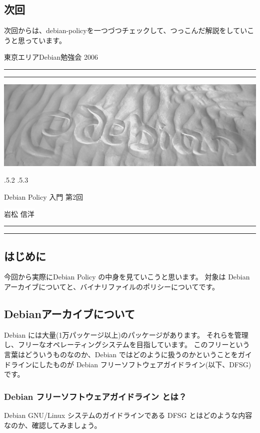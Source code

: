 \documentclass[mingoth,a4paper]{jsarticle}
\makeatletter
\renewcommand{\section}{\@startsection{section}{1}{\z@}%
    {\Cvs \@plus.5\Cdp \@minus.2\Cdp}%
    {.5\Cvs \@plus.3\Cdp}%
    {\normalfont\Huge\headfont\raggedright\centering}} %
\newcommand{\dancersection}[2]{%
\newpage
東京エリアDebian勉強会 2006
\hrule
\vspace{0.5mm}
\hrule
\hfill{}\includegraphics[width=16cm]{image2006-natsu/guruguru-sand-light.png}\\
\vspace{-5cm}
\begin{center}
\section{#1}
\end{center}
\hfill{}\colorbox{white}{#2}\hspace{3cm}\space\\
\vspace{1cm}
\hrule
\vspace{0.5mm}
\hrule
\vspace{1cm}
}
\makeatother
\begin{document}
\subsection{次回}
	次回からは、debian-policyを一つづつチェックして、つっこんだ解説をしていこうと思っています。


\dancersection{Debian Policy 入門 第2回}{岩松 信洋}
\label{sec:uekawa}
\subsection{はじめに}
 今回から実際にDebian Policy の中身を見ていこうと思います。
 対象は Debian アーカイブについてと、バイナリファイルのポリシーについてです。

\subsection{Debianアーカイブについて}

Debian には大量(1万パッケージ以上)のパッケージがあります。
それらを管理し、フリーなオペレーティングシステムを目指しています。
このフリーという言葉はどういうものなのか、Debian ではどのように扱うのかということをガイドラインにしたものが Debian フリーソフトウェアガイドライン(以下、DFSG) です。
 
\subsubsection{Debian フリーソフトウェアガイドライン とは？}

Debian GNU/Linux システムのガイドラインである DFSG とはどのような内容なのか、確認してみましょう。
\end{document}
